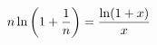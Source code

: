 \documentclass[preview]{standalone}
\begin{document}
\begin{align*}
\special{dvisvgm:raw <g id='unique000'>}n\ln\left(1+\dfrac{1}{n}\right)=\dfrac{\ln(1+x)}{x}\special{dvisvgm:raw </g>}
\end{align*}
\end{document}
